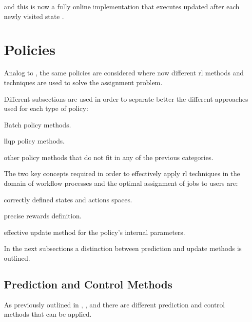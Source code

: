 \documentclass{seal_thesis}
\begin{document}
and this is now a fully online implementation that executes updated after each newly visited state \cite[p. 274]{Sutton2017}. 

\section{ Policies}
\label{sec:rl_policies}

Analog to , the same policies are considered where now different \gls{rl} methods and techniques are used to solve the assignment problem.

Different subsections are used in order to separate better the different approaches used for each type of policy:
\begin{enumerate*}
	\item Batch policy methods.
	\item \gls{llqp} policy methods.
	\item other policy methods that do not fit in any of the previous categories.
\end{enumerate*}

The two key concepts required in order to effectively apply \gls{rl} techniques in the domain of workflow processes and the optimal assignment of jobs to users are:
\begin{enumerate*}
	\item correctly defined states and actions spaces.
	\item precise rewards definition.
	\item effective update method for the policy's internal parameters. 
\end{enumerate*}

In the next subsections a distinction between prediction and update methods is outlined.

\subsection{Prediction and Control Methods}

As previously outlined in , ,  and  there are different prediction and control methods that can be applied.

\subsubsection{}
\end{document}
